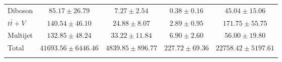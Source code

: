 \begin{table}
\begin{center}
\begin{tabular}{l*{4}{c}}
Diboson & $85.17 \pm 26.79$ & $7.27 \pm 2.54$ & $0.38 \pm 0.16$ & $45.04 \pm 15.06$\\
$t\bar{t}+V$ & $140.54 \pm 46.10$ & $24.88 \pm 8.07$ & $2.89 \pm 0.95$ & $171.75 \pm 55.75$\\
Multijet & $132.85 \pm 48.24$ & $33.22 \pm 11.84$ & $6.90 \pm 2.60$ & $56.00 \pm 19.80$\\
\hline
Total & $41693.56 \pm 6446.46$          & $4839.85 \pm 896.77$          & $227.72 \pm 69.36$          & $22758.42 \pm 5197.61$         \\
\hline\hline     \\
\end{tabular}
\vspace{0.1cm}


\end{center}
\end{table}
